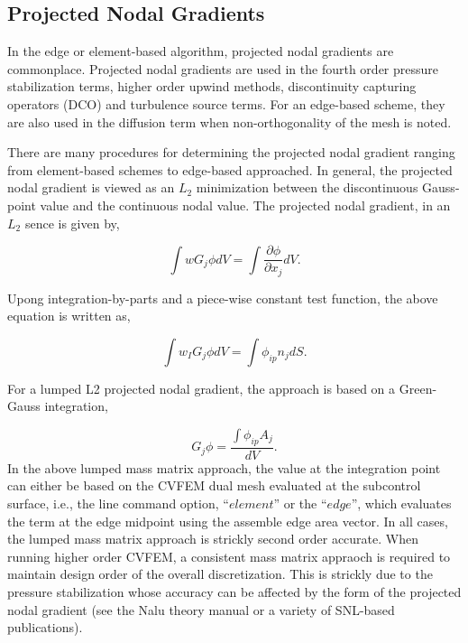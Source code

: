 \subsection{Projected Nodal Gradients}
In the edge or element-based algorithm, projected nodal gradients
are commonplace. Projected nodal gradients are used in the fourth 
order pressure stabilization terms, higher order upwind methods, discontinuity
capturing operators (DCO) and turbulence source terms. For an edge-based scheme, 
they are also used in the diffusion term when non-orthogonality of the mesh is noted.

There are many procedures for determining the projected 
nodal gradient ranging from element-based schemes to
edge-based approached. In general, the projected nodal gradient is viewed as an $L_2$ 
minimization between the discontinuous Gauss-point value and the continuous
nodal value. The projected nodal gradient, in an $L_2$ sence is given by,

\begin{equation}
\int w G_j \phi {dV} = \int \frac{\partial \phi}{\partial x_j}{dV}.
\label{PNG}
\end{equation}

Upong integration-by-parts and a piece-wise constant test function, the above equation
is written as,

\begin{equation}
\int w_I G_j \phi {dV} = \int \phi_{ip} n_j {dS}.
\label{PNG}
\end{equation}

For a lumped L2 projected nodal gradient,
the approach is based on a Green-Gauss integration,

\begin{equation}
G_j \phi = \frac{\int \phi_{ip} A_j}{dV}.
\label{greenGauss}
\end{equation}In the above lumped mass matrix approach, the value at the 
integration point can either be based on the CVFEM dual mesh 
evaluated at the subcontrol surface, i.e., the line command option, 
``$element$'' or the ``$edge$'', which evaluates the term at the edge 
midpoint using the assemble edge area vector. In all cases, the lumped mass
matrix approach is strickly second order accurate. When running higher order 
CVFEM, a consistent mass matrix appraoch is required to maintain design order 
of the overall discretization. This is strickly due to the pressure stabilization
whose accuracy can be affected by the form of the projected nodal gradient (see the Nalu
theory manual or a variety of SNL-based publications).

